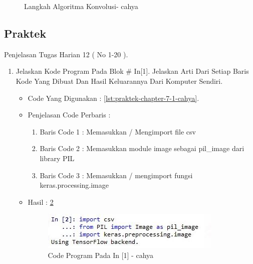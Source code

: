 \begin{enumerate}
\begin{itemize}
\begin{figure}[!hbtp]
\caption{Langkah Algoritma Konvolusi- cahya}
\label{chapter-7-13-cahya}
\end{figure}
\par
\par
\end{itemize}
\end{enumerate}


\subsection{Praktek}
Penjelasan Tugas Harian 12 ( No 1-20 ).
\begin{enumerate}
\item Jelaskan Kode Program Pada Blok \# In[1]. Jelaskan Arti Dari Setiap Baris Kode Yang Dibuat Dan Hasil Keluarannya Dari Komputer Sendiri.
\begin{itemize}
\item Code Yang Digunakan : \ref{lst:praktek-chapter-7-1-cahya}.

\par
\par
\item Penjelasan Code Perbaris	: 
\begin{enumerate}
\item Baris Code 1	: Memasukkan / Mengimport file csv
\item Baris Code 2	: Memasukkan module image sebagai pil\_image dari library PIL
\item Baris Code 3	: Memasukkan / mengimport fungsi keras.processing.image 
\end{enumerate}
\par
\item Hasil : \ref{chapter-7-in-1-cahya}
\par
\par
\begin{figure}[!hbtp]
\centering
\includegraphics[scale=0.4]{figures/Chapter 7/1164066/Praktek/chapter-7-in-1-cahya.jpg}
\caption{Code Program Pada In [1] - cahya}
\label{chapter-7-in-1-cahya}
\end{figure}
\par
\par
\end{itemize}

\end{enumerate}

